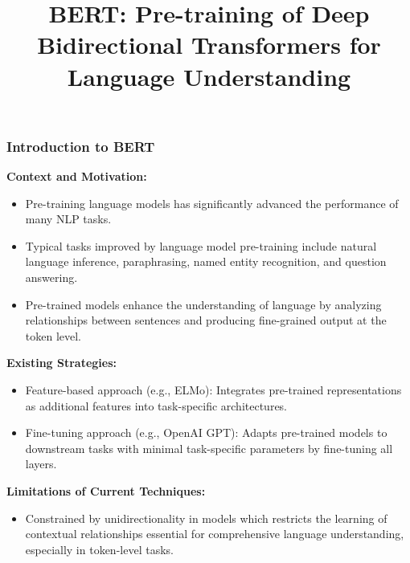 \documentclass[11pt,xcolor={dvipsnames},hyperref={pdftex,pdfpagemode=UseNone,hidelinks,pdfdisplaydoctitle=true},usepdftitle=false]{beamer}
\begin{document}
\title{\textbf{BERT}: Pre-training of Deep Bidirectional Transformers for \\ Language Understanding}
%
\frame{\titlepage}

\begin{frame}
\frametitle{Introduction to BERT}
\textbf{Context and Motivation:}
\begin{itemize}
    \item Pre-training language models has significantly advanced the performance of many NLP tasks.
    \item Typical tasks improved by language model pre-training include natural language inference, paraphrasing, named entity recognition, and question answering.
    \item Pre-trained models enhance the understanding of language by analyzing relationships between sentences and producing fine-grained output at the token level.
\end{itemize}
\textbf{Existing Strategies:}
\begin{itemize}
    \item Feature-based approach (e.g., ELMo): Integrates pre-trained representations as additional features into task-specific architectures.
    \item Fine-tuning approach (e.g., OpenAI GPT): Adapts pre-trained models to downstream tasks with minimal task-specific parameters by fine-tuning all layers.
\end{itemize}
\textbf{Limitations of Current Techniques:}
\begin{itemize}
    \item Constrained by unidirectionality in models which restricts the learning of contextual relationships essential for comprehensive language understanding, especially in token-level tasks.
\end{itemize}
\end{frame}
\end{document}
